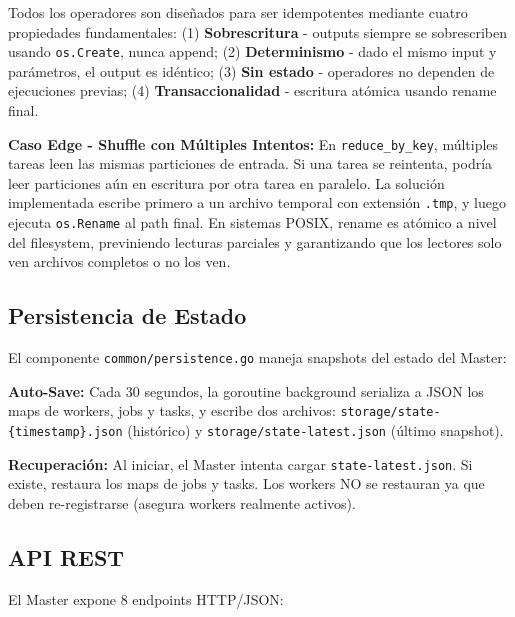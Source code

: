 \documentclass[conference]{IEEEtran}
\begin{document}
Todos los operadores son diseñados para ser idempotentes mediante cuatro propiedades fundamentales: (1) \textbf{Sobrescritura} - outputs siempre se sobrescriben usando \texttt{os.Create}, nunca append; (2) \textbf{Determinismo} - dado el mismo input y parámetros, el output es idéntico; (3) \textbf{Sin estado} - operadores no dependen de ejecuciones previas; (4) \textbf{Transaccionalidad} - escritura atómica usando rename final.

\textbf{Caso Edge - Shuffle con Múltiples Intentos:} En \texttt{reduce\_by\_key}, múltiples tareas leen las mismas particiones de entrada. Si una tarea se reintenta, podría leer particiones aún en escritura por otra tarea en paralelo. La solución implementada escribe primero a un archivo temporal con extensión \texttt{.tmp}, y luego ejecuta \texttt{os.Rename} al path final. En sistemas POSIX, rename es atómico a nivel del filesystem, previniendo lecturas parciales y garantizando que los lectores solo ven archivos completos o no los ven.

\subsection{Persistencia de Estado}

El componente \texttt{common/persistence.go} maneja snapshots del estado del Master:

\textbf{Auto-Save:} Cada 30 segundos, la goroutine background serializa a JSON los maps de workers, jobs y tasks, y escribe dos archivos: \texttt{storage/state-\{timestamp\}.json} (histórico) y \texttt{storage/state-latest.json} (último snapshot).

\textbf{Recuperación:} Al iniciar, el Master intenta cargar \texttt{state-latest.json}. Si existe, restaura los maps de jobs y tasks. Los workers NO se restauran ya que deben re-registrarse (asegura workers realmente activos).

\subsection{API REST}

El Master expone 8 endpoints HTTP/JSON:
\end{document}
